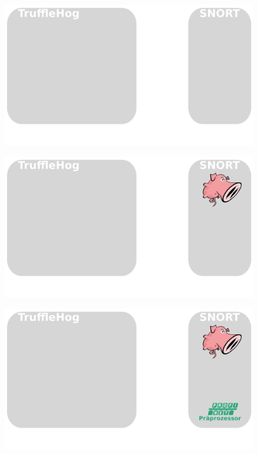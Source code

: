 \documentclass[18pt]{beamer}
\begin{document}
\begin{frame}
    \begin{figure}
    	\centering
    	\includegraphics[width=\textwidth]{./images/jan_1.png}
    \end{figure}
\end{frame}

\begin{frame}
    \begin{figure}
    	\centering
    	\includegraphics[width=\textwidth]{./images/jan_2.png}
    \end{figure}
\end{frame}

\begin{frame}
    \begin{figure}
    	\centering	
    	\includegraphics[width=\textwidth]{./images/jan_3.png}
    \end{figure}
\end{frame}
\end{document}
